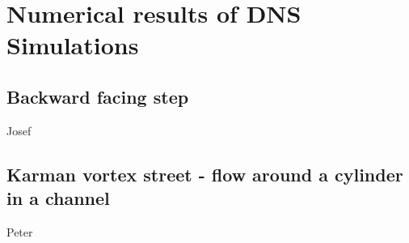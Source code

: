 \chapter{Numerical results of DNS Simulations} %
\label{cha:numerical_results}

\section{Backward facing step} %
\label{sec:backward_facing_step}

Josef


\section{Karman vortex street - flow around a cylinder in a channel} %
\label{sec:karman_vortex_street_flow_around_a_cylinder_in_a_channel}

Peter


